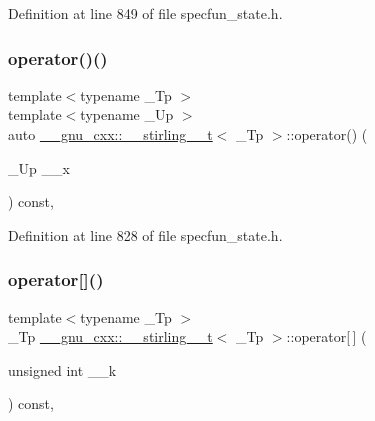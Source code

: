 Definition at line 849 of file specfun\+\_\+state.\+h.

\mbox{\label{struct____gnu__cxx_1_1____stirling__1__t_a3db314b862f56a3b1c5600124e6568e9}} 
\subsubsection{\texorpdfstring{operator()()}{operator()()}}
{\footnotesize\ttfamily template$<$typename \+\_\+\+Tp $>$ \\
template$<$typename \+\_\+\+Up $>$ \\
auto \hyperlink{struct____gnu__cxx_1_1____stirling__1__t}{\+\_\+\+\_\+gnu\+\_\+cxx\+::\+\_\+\+\_\+stirling\+\_\+\_\+t}$<$ \+\_\+\+Tp $>$\+::operator() (\begin{DoxyParamCaption}\item[{\+\_\+\+Up}]{\+\_\+\+\_\+x }\end{DoxyParamCaption}) const\hspace{0.3cm}{\ttfamily [inline]}, {\ttfamily [noexcept]}}



Definition at line 828 of file specfun\+\_\+state.\+h.

\mbox{\label{struct____gnu__cxx_1_1____stirling__1__t_a71c10533ee2313b3cbb04b243275ff20}} 
\subsubsection{\texorpdfstring{operator[]()}{operator[]()}}
{\footnotesize\ttfamily template$<$typename \+\_\+\+Tp $>$ \\
\+\_\+\+Tp \hyperlink{struct____gnu__cxx_1_1____stirling__1__t}{\+\_\+\+\_\+gnu\+\_\+cxx\+::\+\_\+\+\_\+stirling\+\_\+\_\+t}$<$ \+\_\+\+Tp $>$\+::operator\mbox{[}$\,$\mbox{]} (\begin{DoxyParamCaption}\item[{unsigned int}]{\+\_\+\+\_\+k }\end{DoxyParamCaption}) const\hspace{0.3cm}{\ttfamily [inline]}, {\ttfamily [noexcept]}}



